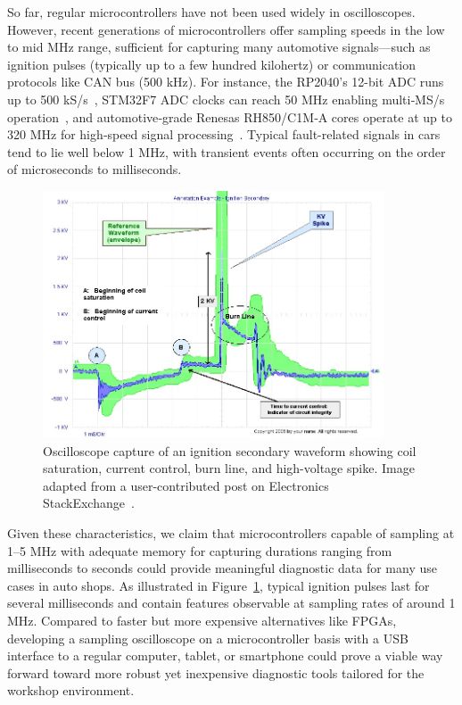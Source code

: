So far, regular microcontrollers have not been used widely in oscilloscopes. 
However, recent generations of microcontrollers offer sampling speeds in the low to mid MHz range, 
sufficient for capturing many automotive signals—such as ignition pulses (typically up to a few hundred kilohertz) or communication protocols like CAN bus (500 kHz). 
For instance, the RP2040’s 12-bit ADC runs up to 500 kS/s~\cite{rp2040ds}, STM32F7 ADC clocks can reach 50 MHz enabling multi‑MS/s operation~\cite{stm32f7ds}, 
and automotive‑grade Renesas RH850/C1M‑A cores operate at up to 320 MHz for high‑speed signal processing~\cite{rh850ds}. 
Typical fault-related signals in cars tend to lie well below 1 MHz, with transient events often occurring on the order of microseconds to milliseconds.

\begin{figure}[h]
  \centering
  \includegraphics[width=0.9\textwidth]{figures/ignition_pulse.jpeg}
  \caption{Oscilloscope capture of an ignition secondary waveform showing coil saturation, current control, burn line, and high-voltage spike. 
  Image adapted from a user-contributed post on Electronics StackExchange~\cite{stackexchangeignition}.}
  \label{fig:ignition-scope}
\end{figure}

Given these characteristics, we claim that microcontrollers capable of sampling at 1–5 MHz with adequate memory for capturing durations ranging from 
milliseconds to seconds could provide meaningful diagnostic data for many use cases in auto shops. 
As illustrated in Figure~\ref{fig:ignition-scope}, typical ignition pulses last for several milliseconds and contain features observable at sampling rates of around 1 MHz.
Compared to faster but more expensive alternatives like FPGAs, developing a sampling oscilloscope on a microcontroller basis with a USB interface to a regular computer, 
tablet, or smartphone could prove a viable way forward toward more robust yet inexpensive diagnostic tools tailored for the workshop environment.

